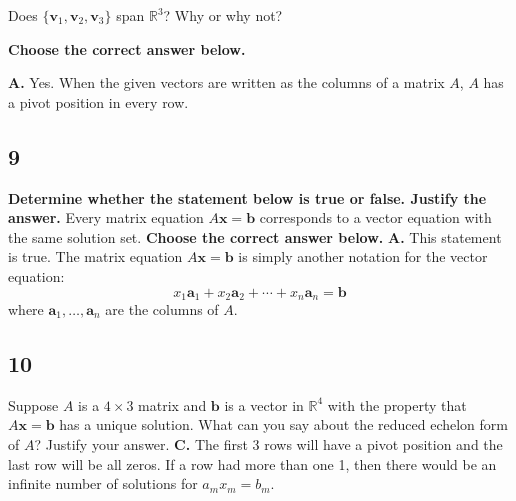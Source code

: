 \documentclass{article}
\begin{document}
Does \( \{ \mathbf{v}_1, \mathbf{v}_2, \mathbf{v}_3 \} \) span \( \mathbb{R}^3 \)? Why or why not?  

\textbf{Choose the correct answer below.}  

\textbf{A.} Yes. When the given vectors are written as the columns of a matrix \( A \), \( A \) has a pivot position in every row.  
\subsection*{9}
\textbf{Determine whether the statement below is true or false. Justify the answer.}
Every matrix equation \( A \mathbf{x} = \mathbf{b} \) corresponds to a vector equation with the same solution set.
\textbf{Choose the correct answer below.}
\textbf{A.} This statement is true. The matrix equation \( A \mathbf{x} = \mathbf{b} \) is simply another notation for the vector equation:
\[x_1 \mathbf{a}_1 + x_2 \mathbf{a}_2 + \cdots + x_n \mathbf{a}_n = \mathbf{b}\]
where \( \mathbf{a}_1, \dots, \mathbf{a}_n \) are the columns of \( A \).
\subsection*{10}
Suppose \( A \) is a \( 4 \times 3 \) matrix and \( \mathbf{b} \) is a vector in \( \mathbb{R}^4 \) with the property that \( A \mathbf{x} = \mathbf{b} \) has a unique solution. What can you say about the reduced echelon form of \( A \)? Justify your answer.
\textbf{C.} The first 3 rows will have a pivot position and the last row will be all zeros. If a row had more than one 1, then there would be an infinite number of solutions for \( a_m x_m = b_m \).
\end{document}
